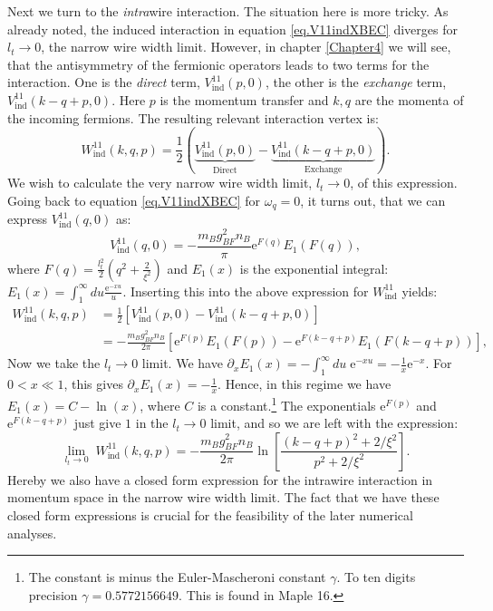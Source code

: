 Next we turn to the \textit{intra}wire interaction. The situation here is more tricky. As already noted, the induced interaction in equation \eqref{eq.V11indXBEC} diverges for $l_t \to 0$, the narrow wire width limit. However, in chapter \ref{Chapter4} we will see, that the antisymmetry of the fermionic operators leads to two terms for the interaction. One is the \textit{direct} term, $V^{11}_{\text{ind}}\left( p, 0 \right)$, the other is the \textit{exchange} term, $V^{11}_{\text{ind}}\left( k - q + p, 0 \right)$. Here $p$ is the momentum transfer and $k, q$ are the momenta of the incoming fermions. The resulting relevant interaction vertex is: 
\begin{equation}
W^{11}_{\text{ind}}(k, q, p) = \frac{1}{2} ( \underset{\text{Direct}}{\underbrace{V^{11}_{\text{ind}}\left( p, 0 \right)}} - \underset{\text{Exchange}}{\underbrace{V^{11}_\text{ind}\left( k - q + p, 0 \right) }} ). 
\label{eq.Wkqp.scattering.amplitude}
\end{equation}
We wish to calculate the very narrow wire width limit, $l_t \to 0$, of this expression. Going back to equation \eqref{eq.V11indXBEC} for $\omega_q = 0$, it turns out, that we can express $V^{11}_\text{ind}\left( q, 0 \right)$ as:
\begin{equation}
V^{11}_{\text{ind}}(q, 0) = -\frac{m_Bg_{BF}^2n_B}{\pi} \text{e}^{F(q)} E_1(F(q)),
\label{eq.V11indq.zerofrequency.ltnonzero}
\end{equation}
where $F(q) = \frac{l_t^2}{2}\left(q^2 + \frac{2}{\xi^2} \right)$ and $E_1(x)$ is the exponential integral: $E_1(x) = \int_1^\infty du \frac{\text{e}^{-xu}}{u}$. Inserting this into the above expression for $W^{11}_{\text{ind}}$ yields:
\begin{align}
W^{11}_{\text{ind}}(k, q, p) &= \frac{1}{2}\left[V^{11}_\text{ind}(p, 0) - V^{11}_\text{ind}(k - q + p, 0)\right] \nonumber \\
&= -\frac{m_Bg_{BF}^2n_B}{2\pi}\left[ \text{e}^{F(p)} E_1(F(p)) - \text{e}^{F(k - q + p)} E_1(F(k - q + p)) \right], \nonumber
\end{align}
Now we take the $l_t \to 0$ limit. We have $\partial_x E_1(x) = -\int_1^{\infty}du\; \text{e}^{-xu} = -\frac{1}{x}\text{e}^{-x}$. For $0 < x \ll 1$, this gives $\partial_xE_1(x) = -\frac{1}{x}$. Hence, in this regime we have $E_1(x) = C -\ln(x)$, where $C$ is a constant.\footnote{The constant is minus the Euler-Mascheroni constant $\gamma$. To ten digits precision $\gamma = 0.5772156649$. This is found in Maple 16.} The exponentials $\text{e}^{F(p)}$ and $\text{e}^{F(k - q + p)}$ just give $1$ in the $l_t \to 0$ limit, and so we are left with the expression:
\begin{equation}
\lim_{l_t \to 0} \; W^{11}_{\text{ind}}(k, q, p) = -\frac{m_Bg_{BF}^2n_B}{2\pi} \ln\left[\frac{(k - q + p)^2 + 2/\xi^2}{p^2 + 2/\xi^2}\right].
\label{eq.Wkqp.scattering.amplitude.lt=0} 
\end{equation}
Hereby we also have a closed form expression for the intrawire interaction in momentum space in the narrow wire width limit. The fact that we have these closed form expressions is crucial for the feasibility of the later numerical analyses.




